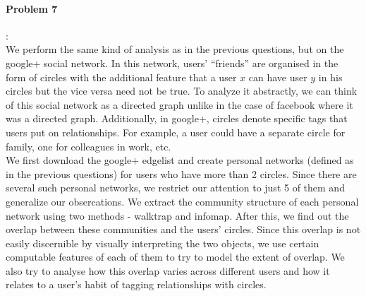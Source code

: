 \documentclass{article}
\begin{document}
\paragraph{Problem 7}:\\
We perform the same kind of analysis as in the previous questions, but on
the google+ social network. In this network, users' ``friends'' are organised in the form of circles
with the additional feature that a user $x$ can have user $y$ in his circles but the vice versa need not be true.
To analyze it abstractly, we can think of this social network as a directed graph unlike in the case of facebook where
it was a directed graph. Additionally, in google+, circles denote specific tags that users put on relationships. 
For example, a user could have a separate circle for family, one for colleagues in work, etc.\\

We first download the google+ edgelist and 
create personal networks (defined as in the previous questions) for users who have more than 2 circles. 
Since there are several such personal networks, we restrict our attention to just 5 of them and
generalize our obsercations. We extract the community structure of each personal network using two methods - 
walktrap and infomap. After this, we find out the overlap between these communities and the users' circles. Since
this overlap is not easily discernible by visually interpreting the two objects, we use certain computable features
of each of them to try to model the extent of overlap. We also try to analyse how this overlap varies across different users
and how it relates to a user's habit of tagging relationships with circles.\\
\end{document}
